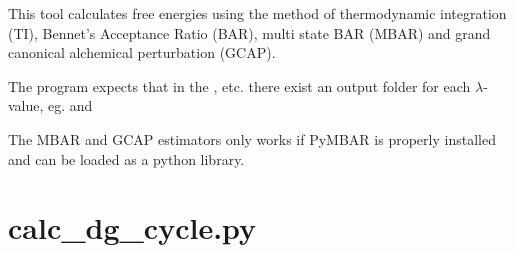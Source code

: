 \documentclass[letterpaper,10pt,english]{sphinxmanual}
\begin{document}
%
\begin{sphinxVerbatim}[commandchars=\\\{\}]
  
      
      
       
      
         
\end{sphinxVerbatim}


This tool calculates free energies using the method of thermodynamic integration (TI), Bennet’s Acceptance Ratio (BAR), multi state BAR (MBAR) and grand canonical alchemical perturbation (GCAP).

The program expects that in the ,  etc. there exist an output folder for each \(\lambda\)-value, eg.  and 

The MBAR and GCAP estimators only works if PyMBAR is properly installed and can be loaded as a python library.


\section{calc\_dg\_cycle.py}
\label{\detokenize{tools:calc-dg-cycle-py}}
\end{document}
